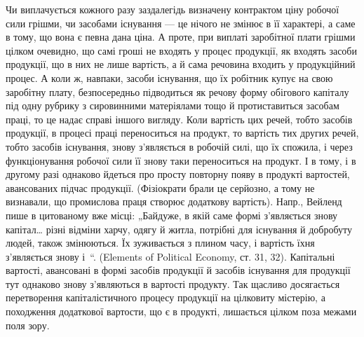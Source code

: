 Чи виплачується кожного разу заздалегідь визначену контрактом ціну
робочої сили грішми, чи засобами існування — це нічого не змінює в її
характері, а саме в тому, що вона є певна дана ціна. А проте, при виплаті
заробітної плати грішми цілком очевидно, що самі гроші не входять
у процес продукції, як входять засоби продукції, що в них не лише
вартість, а й сама речовина входить у продукційний процес. А коли ж,
навпаки, засоби існування, що їх робітник купує на свою заробітну плату,
безпосередньо підводиться як речову форму обігового капіталу під
одну рубрику з сировинними матеріялами тощо й протиставиться засобам
праці, то це надає справі іншого вигляду. Коли вартість цих речей,
тобто засобів продукції, в процесі праці переноситься на продукт, то
вартість тих других речей, тобто засобів існування, знову з’являється в
робочій силі, що їх спожила, і через функціонування робочої сили її знову
таки переноситься на продукт. І в тому, і в другому разі однаково
йдеться про просту повторну появу в продукті вартостей, авансованих
підчас продукції. (Фізіократи брали це серйозно, а тому не визнавали,
що промислова праця створює додаткову вартість). Напр., Вейленд
пише в цитованому вже місці: „Байдуже, в якій саме формі з’являється
знову капітал\dots{} різні відміни харчу, одягу й житла, потрібні для існування
й добробуту людей, також змінюються. Їх зуживається з плином
часу, і вартість їхня з’являється знову і~“. (Elements of Political
Economy, ст. 31, 32). Капітальні вартості, авансовані в формі
засобів продукції й засобів існування для продукції тут однаково знову
з’являються в вартості продукту. Так щасливо досягається перетворення
капіталістичного процесу продукції на цілковиту містерію, а походження
додаткової вартости, що є в продукті, лишається цілком поза
межами поля зору.

